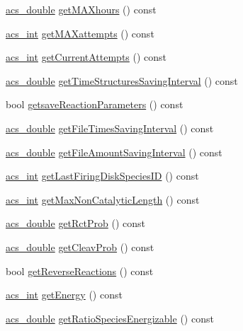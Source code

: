 \begin{DoxyCompactItemize}
\item 
\hyperlink{a00050_ab776853a005fcbf56af0424a2a4dd607}{acs\+\_\+double} \hyperlink{a00013_af2b482132fc3ab299118f7a894bd53a2}{get\+M\+A\+Xhours} () const 
\item 
\hyperlink{a00050_a8d277355641a098190360234e2ebde35}{acs\+\_\+int} \hyperlink{a00013_ae626b961a53eeb5e08b4190da235e8dd}{get\+M\+A\+Xattempts} () const 
\item 
\hyperlink{a00050_a8d277355641a098190360234e2ebde35}{acs\+\_\+int} \hyperlink{a00013_a0851e3481e6fec7f4feef126d5a6704c}{get\+Current\+Attempts} () const 
\item 
\hyperlink{a00050_ab776853a005fcbf56af0424a2a4dd607}{acs\+\_\+double} \hyperlink{a00013_a892dd7bd29342c4206c39556d91a83da}{get\+Time\+Structures\+Saving\+Interval} () const 
\item 
bool \hyperlink{a00013_a19f10c43e263fbc167bbd4cc760c92ff}{getsave\+Reaction\+Parameters} () const 
\item 
\hyperlink{a00050_ab776853a005fcbf56af0424a2a4dd607}{acs\+\_\+double} \hyperlink{a00013_a77e995bee54ab4e09f165a857a7b0272}{get\+File\+Times\+Saving\+Interval} () const 
\item 
\hyperlink{a00050_ab776853a005fcbf56af0424a2a4dd607}{acs\+\_\+double} \hyperlink{a00013_adf74cb3545d95a7965e3a18cfc98cebe}{get\+File\+Amount\+Saving\+Interval} () const 
\item 
\hyperlink{a00050_a8d277355641a098190360234e2ebde35}{acs\+\_\+int} \hyperlink{a00013_a984f79e5f89b774b65db901899687ac0}{get\+Last\+Firing\+Disk\+Species\+I\+D} () const 
\item 
\hyperlink{a00050_a8d277355641a098190360234e2ebde35}{acs\+\_\+int} \hyperlink{a00013_aca760caf9354f541020c1db58490b18f}{get\+Max\+Non\+Catalytic\+Length} () const 
\item 
\hyperlink{a00050_ab776853a005fcbf56af0424a2a4dd607}{acs\+\_\+double} \hyperlink{a00013_ae244aa972cf10c103b8b20d95703831f}{get\+Rct\+Prob} () const 
\item 
\hyperlink{a00050_ab776853a005fcbf56af0424a2a4dd607}{acs\+\_\+double} \hyperlink{a00013_ac728f6ab012c42fa85a2e2f70df7dc58}{get\+Cleav\+Prob} () const 
\item 
bool \hyperlink{a00013_a2a2ac2a8140df67688a71d3349adf04a}{get\+Reverse\+Reactions} () const 
\item 
\hyperlink{a00050_a8d277355641a098190360234e2ebde35}{acs\+\_\+int} \hyperlink{a00013_ab463a460de102c79c1044ab8a2c176ae}{get\+Energy} () const 
\item 
\hyperlink{a00050_ab776853a005fcbf56af0424a2a4dd607}{acs\+\_\+double} \hyperlink{a00013_a4fcc6030b68a37bedff870b9c48c188d}{get\+Ratio\+Species\+Energizable} () const 

\end{DoxyCompactItemize}
